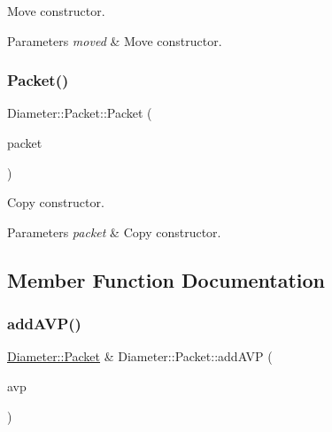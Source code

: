 Move constructor. 


\begin{DoxyParams}{Parameters}
{\em moved} & Move constructor. \\
\hline
\end{DoxyParams}
\mbox{\label{classDiameter_1_1Packet_a4faed7c2dbc68943e4aa6a500f58e5d6}} 
\subsubsection{\texorpdfstring{Packet()}{Packet()}\hspace{0.1cm}{\footnotesize\ttfamily [3/3]}}
{\footnotesize\ttfamily Diameter\+::\+Packet\+::\+Packet (\begin{DoxyParamCaption}\item[{const \hyperlink{classDiameter_1_1Packet}{Packet} \&}]{packet }\end{DoxyParamCaption})}



Copy constructor. 


\begin{DoxyParams}{Parameters}
{\em packet} & Copy constructor. \\
\hline
\end{DoxyParams}


\subsection{Member Function Documentation}
\mbox{\label{classDiameter_1_1Packet_a36d19bb1e2ff1517dea5927bd77cc7b9}} 
\subsubsection{\texorpdfstring{add\+A\+V\+P()}{addAVP()}}
{\footnotesize\ttfamily \hyperlink{classDiameter_1_1Packet}{Diameter\+::\+Packet} \& Diameter\+::\+Packet\+::add\+A\+VP (\begin{DoxyParamCaption}\item[{\hyperlink{classDiameter_1_1AVP}{Diameter\+::\+A\+VP}}]{avp }\end{DoxyParamCaption})}



